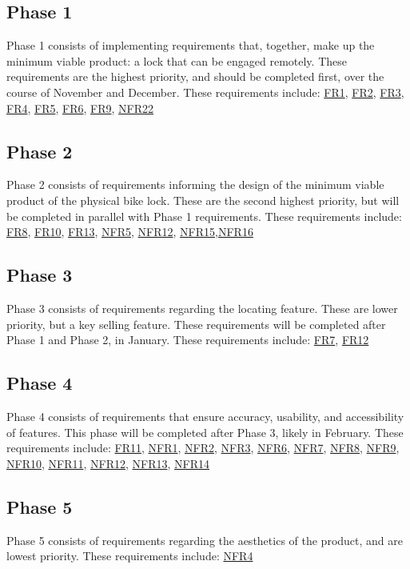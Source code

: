 \documentclass[12pt]{article}
\begin{document}
\subsection{Phase 1}
Phase 1 consists of implementing requirements that, together, make up the minimum viable product: a lock that can be engaged remotely. These requirements are the highest priority, and should be completed first, over the course of November and December. These requirements include:
\hyperref[FR1]{FR1}, \hyperref[FR2]{FR2}, \hyperref[FR3]{FR3}, \hyperref[FR4]{FR4}, \hyperref[FR5]{FR5}, \hyperref[FR6]{FR6}, \hyperref[FR9]{FR9}, \hyperref[NFR22]{NFR22}

\subsection{Phase 2}
Phase 2 consists of requirements informing the design of the minimum viable product of the physical bike lock. These are the second highest priority, but will be completed in parallel with Phase 1 requirements. These requirements include:
\hyperref[FR8]{FR8}, \hyperref[FR10]{FR10}, \hyperref[FR13]{FR13}, \hyperref[NFR5]{NFR5}, \hyperref[NFR12]{NFR12}, \hyperref[NFR15]{NFR15},\hyperref[NFR16]{NFR16}

\subsection{Phase 3}
Phase 3 consists of requirements regarding the locating feature. These are lower priority, but a key selling feature. These requirements will be completed after Phase 1 and Phase 2, in January. These requirements include:
\hyperref[FR7]{FR7}, \hyperref[FR12]{FR12}

\subsection{Phase 4}
Phase 4 consists of requirements that ensure accuracy, usability, and accessibility of features. This phase will be completed after Phase 3, likely in February. These requirements include:
\hyperref[FR11]{FR11}, \hyperref[NFR1]{NFR1}, \hyperref[NFR2]{NFR2}, \hyperref[NFR3]{NFR3}, \hyperref[NFR6]{NFR6}, \hyperref[NFR7]{NFR7}, \hyperref[NFR8]{NFR8}, \hyperref[NFR9]{NFR9}, \hyperref[NFR10]{NFR10}, \hyperref[NFR11]{NFR11}, \hyperref[NFR12]{NFR12}, \hyperref[NFR13]{NFR13}, \hyperref[NFR14]{NFR14}

\subsection{Phase 5}
Phase 5 consists of requirements regarding the aesthetics of the product, and are lowest priority. These requirements include: \hyperref[NFR4]{NFR4}
\end{document}
